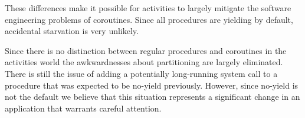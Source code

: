 \documentclass[pldi,10pt,preprint]{sigplanconf-pldi16}
\begin{document}
These differences make it possible for activities to largely mitigate the software engineering problems of coroutines.
Since all procedures are yielding by default, accidental starvation is very unlikely.

Since there is no distinction between regular procedures and coroutines in the activities world the awkwardnesses about partitioning are largely eliminated.
There is still the issue of adding a potentially long-running system call to a procedure that was expected to be no-yield previously.
However, since no-yield is not the default we believe that this situation represents a significant change in an application that warrants careful attention.




\end{document}
